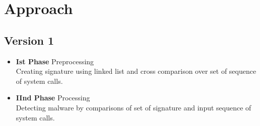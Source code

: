 \section{Approach}
\subsection{Version 1}
    \begin{itemize}
        \item[] \textbf{Ist Phase} Preprocessing \\ Creating signature using linked list and cross comparison over set of sequence of system calls.
        \item[] \textbf{IInd Phase} Processing \\ Detecting malware by comparisons of set of signature and input sequence of system calls.
    \end{itemize}
